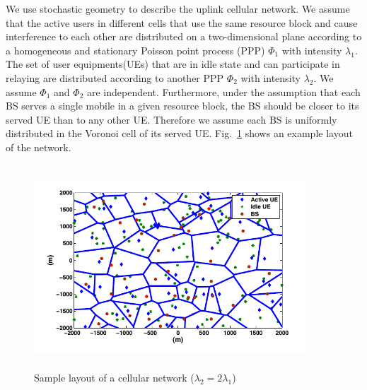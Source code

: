 \par We use stochastic geometry to
describe the uplink cellular network. We
assume that the active users in different cells that use the same resource block and cause interference to each other are distributed on a two-dimensional plane according to a homogeneous and stationary Poisson point process (PPP)
$\Phi_1$ with intensity $\lambda_1$. The set of user equipments(UEs) that are in idle state and can participate in relaying are distributed according to another PPP $\Phi_2$ with intensity $\lambda_2$. We assume $\Phi_1$ and $\Phi_2$ are independent. Furthermore, under the assumption that each BS serves a
single mobile in a given resource block, the BS should be closer to its served UE than to any other UE. Therefore we assume each BS is uniformly distributed in the Voronoi cell of its served UE. Fig.~\ref{fig:netLayout} shows an example layout of the network.

\begin{figure}[h]
	\centering \vspace{-0.1in}
	\includegraphics[height = 3in,width=4in,angle=00]{images/netLayoutPaper.png}
	\vspace{-20pt} 
	\caption[Sample layout of a cellular network ($\lambda_2 = 2\lambda_1$)]{\small  Sample layout of a cellular network ($\lambda_2 = 2\lambda_1$) \footnotemark}
	\label{fig:netLayout}
\end{figure}



